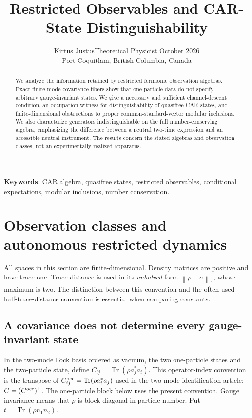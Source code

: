 \documentclass[11pt]{article}
\title{Restricted Observables and CAR-State Distinguishability}
\author{Kirtus Justus\enspace\textbullet\enspace Theoretical Physicist\enspace\textbullet\enspace 23 October 2026\\Port Coquitlam, British Columbia, Canada}
\date{}
\newcommand{\Tr}{\operatorname{Tr}}
\newcommand{\norm}[1]{\left\|#1\right\|}
\theoremstyle{definition}
\begin{document}
\maketitle
\begin{abstract}
We analyze the information retained by restricted fermionic observation algebras. Exact finite-mode covariance fibers show that one-particle data do not specify arbitrary gauge-invariant states. We give a necessary and sufficient channel-descent condition, an occupation witness for distinguishability of quasifree CAR states, and finite-dimensional obstructions to proper common-standard-vector modular inclusions. We also characterize generators indistinguishable on the full number-conserving algebra, emphasizing the difference between a neutral two-time expression and an accessible neutral instrument. The results concern the stated algebras and observation classes, not an experimentally realized apparatus.
\end{abstract}
\noindent\textbf{Keywords:} CAR algebra, quasifree states, restricted observables, conditional expectations, modular inclusions, number conservation.

\section{Observation classes and autonomous restricted dynamics}
\label{sec:observation-results}
All spaces in this section are finite-dimensional. Density matrices are
positive and have trace one. Trace distance is used in its \emph{unhalved}
form $\norm{\rho-\sigma}_1$, whose maximum is two. The distinction between
this convention and the often used half-trace-distance convention is essential
when comparing constants.

\subsection{A covariance does not determine every gauge-invariant state}
In the two-mode Fock basis ordered as vacuum, the two one-particle states and
the two-particle state, define
$C_{ij}=\Tr(\rho a_j^*a_i)$. This operator-index convention is the
transpose of $C^{\rm occ}_{ij}=\Tr(\rho a_i^*a_j)$ used in the
two-mode identification article: $C=(C^{\rm occ})^{\mathsf T}$.
The one-particle block below uses the present convention.
Gauge invariance means that $\rho$ is block
diagonal in particle number. Put $t=\Tr(\rho n_1n_2)$.
\end{document}
